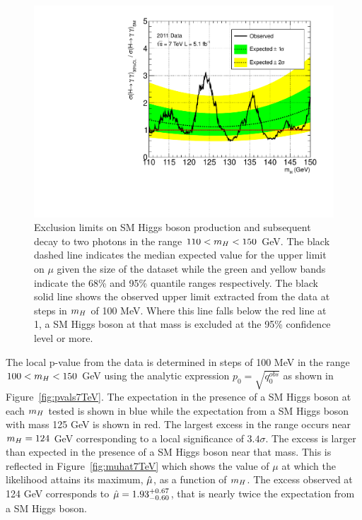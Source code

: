 \begin{figure}
\begin{center}
  \includegraphics[width=.8\textwidth]{hgg7TeV/statsPlots/limit-100MeV.pdf}
\end{center}
 \caption{Exclusion limits on SM Higgs boson production and subsequent decay to two photons in the range
 $110 < m_{H} < 150$ GeV. The black dashed line indicates the median expected value for the upper limit on $\mu$
 given the size of the dataset while the green and yellow bands indicate the 68\% and 95\% quantile ranges 
 respectively.
 The black solid line shows the observed upper limit extracted from the data at steps in $m_{H}$ of 100 MeV. 
 Where this line falls below the red line at 1, a SM Higgs boson at that mass is excluded at the 95\% confidence level or more.}
 \label{fig:limits7TeV}
\end{figure}

The local p-value from the data is determined in steps of 100 MeV in the range $100 < m_{H} < 150 $ GeV
using the analytic expression $p_{0} = \sqrt{q_{0}^{obs}}$
as shown in Figure~\ref{fig:pvals7TeV}. The expectation in the presence of a SM Higgs boson at each $m_{H}$ tested
is shown in blue while the expectation from a SM Higgs boson with mass 125 GeV is shown in red. 
The largest excess in the range occurs near $m_{H}=124$ GeV corresponding
to a local significance of $3.4\sigma$. The excess is larger than expected in the presence of a SM 
Higgs boson near that mass. This is reflected in Figure~\ref{fig:muhat7TeV} which shows the value of 
$\mu$ at which the likelihood attains its maximum, $\hat{\mu}$, as a function of $m_{H}$. 
The excess observed at 124 GeV corresponds to $\hat{\mu}=1.93^{+0.67}_{-0.60}$, that is nearly twice 
the expectation from a SM Higgs boson.

